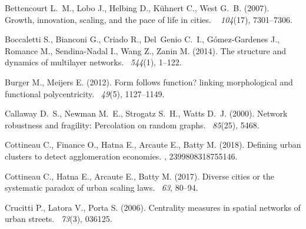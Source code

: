 \documentclass{article}
\begin{document}
\begin{thebibliography}{}
Bettencourt L.~M., Lobo J., Helbing D., K{\"u}hnert C., West G.~B. (2007).
\newblock Growth, innovation, scaling, and the pace of life in cities.
~{\em
  104\/}(17), 7301--7306.


Boccaletti S., Bianconi G., Criado R., Del~Genio C.~I., G{\'o}mez-Gardenes J.,
  Romance M., Sendina-Nadal I., Wang Z., Zanin M. (2014).
\newblock The structure and dynamics of multilayer networks.
~{\em 544\/}(1), 1--122.


Burger M., Meijers E. (2012).
\newblock Form follows function? linking morphological and functional
  polycentricity.
~{\em 49\/}(5), 1127--1149.


Callaway D.~S., Newman M.~E., Strogatz S.~H., Watts D.~J. (2000).
\newblock Network robustness and fragility: Percolation on random graphs.
~{\em 85\/}(25), 5468.


Cottineau C., Finance O., Hatna E., Arcaute E., Batty M. (2018).
\newblock Defining urban clusters to detect agglomeration economies.
,
  2399808318755146.


Cottineau C., Hatna E., Arcaute E., Batty M. (2017).
\newblock Diverse cities or the systematic paradox of urban scaling laws.
~{\em 63}, 80--94.


Crucitti P., Latora V., Porta S. (2006).
\newblock Centrality measures in spatial networks of urban streets.
~{\em 73\/}(3), 036125.



\end{thebibliography}
\end{document}
